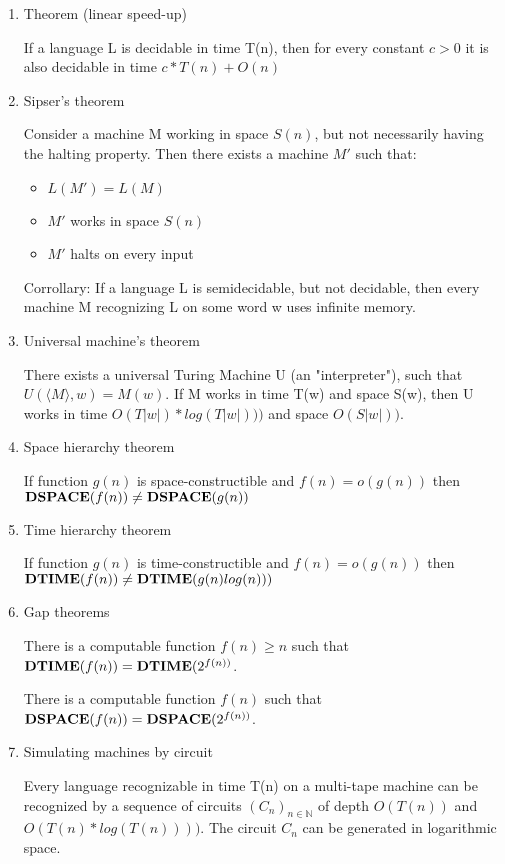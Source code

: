 \begin{enumerate}
    \item Theorem (linear speed-up)
    
    If a language L is decidable in time T(n), then for every constant $c > 0$ it is also decidable in time $c*T(n) + O(n)$
    
    \item Sipser's theorem
    
    Consider a machine M working in space $S(n)$, but not necessarily having the halting property. Then there exists a machine $M'$ such that:
    \begin{itemize}
        \item $L(M') = L(M)$
        \item $M'$ works in space $S(n)$
        \item $M'$ halts on every input
    \end{itemize}
    Corrollary: If a language L is semidecidable, but not decidable, then every machine M recognizing L on some word w uses infinite memory.
    
    \item Universal machine's theorem
    
    There exists a universal Turing Machine U (an "interpreter"), such that $U(\langle M \rangle,w) = M(w)$. If M works in time T(w) and space S(w), then U works in time  $O(T|w|)*log(T|w|)))$ and space $O(S|w|)).$
    
    \item Space hierarchy theorem
    
    If function $g(n)$ is space-constructible and $f(n)=o (g(n))$ then $\textbf{DSPACE}(f(n)) \neq \textbf{DSPACE}(g(n))$
    
    \item Time hierarchy theorem
    
    If function $g(n)$ is time-constructible and $f(n)=o (g(n))$ then $\textbf{DTIME}(f(n)) \neq \textbf{DTIME}(g(n)log(n)))$
    
    \item Gap theorems
    
    There is a computable function $f(n) \geq n$ such that $\textbf{DTIME}(f(n)) = \textbf{DTIME}(2^{f(n))}$.
    
    There is a computable function $f(n)$ such that $\textbf{DSPACE}(f(n)) = \textbf{DSPACE}(2^{f(n))}$.
    
    \item Simulating machines by circuit
    
    Every language recognizable in time T(n) on a multi-tape machine can be recognized by a sequence of circuits $(C_{n})_{n \in \mathbb{N}}$ of depth $O(T(n))$ and $O(T(n)*log(T(n))))$. The circuit $C_n$ can be generated in logarithmic space.
    

\end{enumerate}
